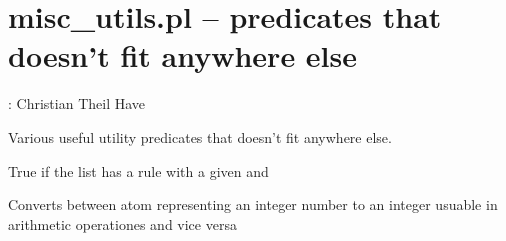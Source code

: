 


\section{misc_utils.pl -- predicates that doesn't fit anywhere else}

\label{sec:miscutils}

\begin{tags}
: Christian Theil Have
\end{tags}

Various useful utility predicates that doesn't fit anywhere else.\vspace{0.7cm}

\begin{description}
True if the list  has a rule with a given  and 

Converts between atom representing an integer number to an
integer usuable in arithmetic operationes and vice versa
\end{description}

